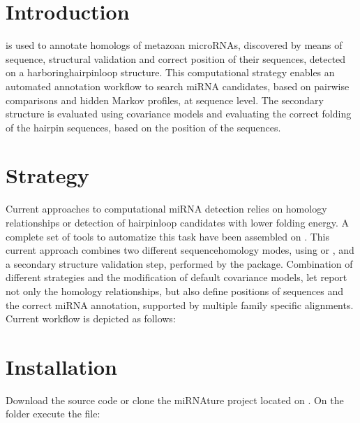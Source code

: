 \documentclass[letterpaper,10pt,english]{sphinxmanual}
\let\sphinxpxdimen\pdfpxdimen\else\newdimen\sphinxpxdimen
\begin{document}
\section{Introduction}
\label{\detokenize{index:introduction}}
 is used to annotate homologs of metazoan microRNAs, discovered by means of
sequence, structural validation and correct position of their  sequences,
detected on a harboring\sphinxhyphen{}hairpin\sphinxhyphen{}loop structure. This computational strategy enables
an automated annotation workflow to search  miRNA candidates, based
on pairwise comparisons and hidden Markov profiles, at sequence level. The
secondary structure is evaluated using covariance models and evaluating the
correct folding of the hairpin sequences, based on the position of the 
sequences.


\section{Strategy}
\label{\detokenize{index:strategy}}
Current approaches to computational miRNA detection relies on homology relationships
or detection of hairpin\sphinxhyphen{}loop candidates with lower folding energy. A complete set of
tools to automatize this task have been assembled on . This current
approach combines two different sequence\sphinxhyphen{}homology modes, using  or , and
a secondary structure validation step, performed by the  package. Combination
of different strategies and the modification of default covariance models, let 
report not only the homology relationships, but also define positions of  sequences
and the correct miRNA annotation, supported by multiple family specific alignments.
Current workflow is depicted as follows:

\noindent\sphinxincludegraphics[width=600\sphinxpxdimen]{{mirnature}.png}


\section{Installation}
\label{\detokenize{index:installation}}
Download the source code or clone the miRNAture project located on .
On the  folder execute the file:
\end{document}
